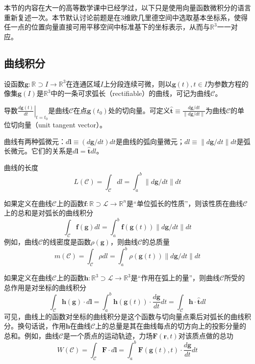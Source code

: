 \documentclass[main.tex]{subfiles}
\begin{document}
本节的内容在大一的高等数学课中已经学过\cite[第九章]{华工高数2009下}，以下只是使用向量函数微积分的语言重新复述一次。本节默认讨论前题是在3维欧几里德空间中选取基本坐标系，使得任一点的位置向量直接可用平移空间中标准基下的坐标表示，从而与$\mathbb{R}^3$一一对应。

\subsection{曲线积分}
设函数$\mathbf{g}:\mathbb{R}\supset I\rightarrow\mathbb{R}^3$在连通区域$I$上分段连续可微，则以$\mathbf{g}\left(t\right),t\in I$为参数方程的像集$\mathbf{g}\left(I\right)$是$\mathbb{R}^3$中的一条可求弧长（rectifiable）的曲线，可记为曲线$\mathcal{C}$。

导数$\left.\frac{d\mathbf{g}\left(t\right)}{dt}\right|_{t=t_0}$是曲线$\mathcal{C}$在点$\mathbf{g}\left(t_0\right)$处的切向量。可定义$\mathbf{\hat{t}}\equiv\frac{d\mathbf{g}/dt}{\left\|d\mathbf{g}/dt\right\|}$为曲线$\mathcal{C}$的单位切向量（unit tangent vector）。

曲线有两种弧微元：$d\mathbf{l}\equiv\left(d\mathbf{g}/dt\right)dt$是曲线的弧向量微元；$dl\equiv\left\|d\mathbf{g}/dt\right\|dt$是弧长微元。它们的关系是$d\mathbf{l}=\mathbf{\hat{t}}dl$。

曲线的长度
\[L\left(\mathcal{C}\right)=\int_\mathcal{C}dl=\int_a^b\left\|d\mathbf{g}/dt\right\|dt
\]

如果定义在曲线$\mathcal{C}$上的函数$\mathbf{f}:\mathbb{R}\supset\mathcal{L}\rightarrow\mathbb{R}^n$是“单位弧长的性质”，则该性质在曲线$\mathcal{C}$上的总和是对弧长的曲线积分\cite[p.~133,定理9.1.1]{华工高数2009下}
\[
\int_\mathcal{C}\mathbf{f}\left(\mathbf{g}\right)dl=\int_{a}^{b}\mathbf{f}\left(\mathbf{g}\left(t\right)\right)\left\|d\mathbf{g}/dt\right\|dt
\]
例如，曲线$\mathcal{C}$的线密度是函数$\rho\left(\mathbf{g}\right)$，则曲线$\mathcal{C}$的总质量
\[
m\left(\mathcal{C}\right)=\int_\mathcal{C}\rho dl=\int_a^b\rho\left(\mathbf{g}\left(t\right)\right)\left\|d\mathbf{g}/dt\right\|dt
\]

如果定义在曲线$\mathcal{C}$上的函数$\mathbf{h}:\mathbb{R}^3\supset\mathcal{L}\rightarrow\mathbb{R}^3$是“作用在弧上的量”，则曲线$\mathcal{C}$所受的总作用是对坐标的曲线积分\cite[p.~140,定理9.2.1]{华工高数2009下}
\[
\int_\mathcal{C}\mathbf{h}\left(\mathbf{g}\right)\cdot d\mathbf{l}=\int_a^b\mathbf{h}\left(\mathbf{g}\left(t\right)\right)\cdot\frac{d\mathbf{g}}{dt}dt=\int_\mathcal{C}\mathbf{h}\cdot\mathbf{\hat{t}}dl
\]
可见，曲线上的函数对坐标的曲线积分是这个函数与切向量点乘后对弧长的曲线积分。换句话说，作用$\mathbf{h}$在曲线$\mathcal{C}$上的总量是其在曲线每点的切方向上的投影分量的总和。例如，曲线$\mathcal{C}$是一个质点的运动轨迹，力场$\mathbf{F}\left(\mathbf{r},t\right)$对该质点做的总功
\[W\left(\mathcal{C}\right)=\int_\mathcal{C}\mathbf{F}\cdot d\mathbf{l}=\int_a^b\mathbf{F}\left(\mathbf{g}\left(t\right),t\right)\cdot \frac{d\mathbf{g}}{dt}dt
\]
\end{document}
